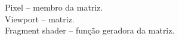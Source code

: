 \documentclass[preview]{standalone}
\begin{document}
Pixel -- membro da matriz.\\Viewport -- matriz.\\Fragment shader -- função geradora da matriz.\\
\end{document}
